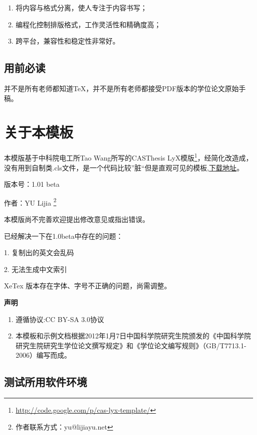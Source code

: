 \documentclass[a4paper,12pt,oneside,openany]{book}
\begin{document}
\begin{enumerate}
\item 将内容与格式分离，使人专注于内容书写；
\item 编程化控制排版格式，工作灵活性和精确度高；
\item 跨平台，兼容性和稳定性非常好。
\end{enumerate}

\section{用前必读}

并不是所有老师都知道\TeX，并不是所有老师都接受PDF版本的学位论文原始手稿。

\chapter{关于本模板}
本模版基于中科院电工所Tao Wang所写的CASThesis LyX模版\footnote{\href{http://code.google.com/p/cas-lyx-template/}{http://code.google.com/p/cas-lyx-template/}}，经简化改造成，没有用到自制类.cls文件，是一个代码比较”脏“但是直观可见的模板,\href{http://github.com/yulijia/LaTeX_UCASthesis}{下载地址}。

版本号：1.01 beta%

作者：YU Lijia%
\footnote{作者联系方式：yu@lijiayu.net%
}

本模版尚不完善欢迎提出修改意见或指出错误。

已经解决一下在1.0beta中存在的问题：

1. 复制出的英文会乱码

2. 无法生成中文索引

XeTex 版本存在字体、字号不正确的问题，尚需调整。

\begin{center}
\textbf{声明}
\par\end{center}
\begin{enumerate}
\item 遵循协议:CC BY-SA 3.0协议
\item 本模板和示例文档根据2012年1月7日中国科学院研究生院颁发的《中国科学院研究生院研究生学位论文撰写规定》和《学位论文编写规则》（GB/T7713.1-2006）编写而成。
\end{enumerate}

\section{测试所用软件环境}
\end{document}
